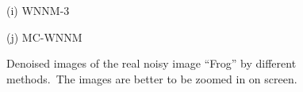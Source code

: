\documentclass[10pt,onecolumn,letterpaper]{article}
\begin{document}
\begin{figure}
{\begin{minipage}[t]{0.2\textwidth}
{\footnotesize (i) WNNM-3 \cite{wnnm}   }
\end{minipage}
\begin{minipage}[t]{0.2\textwidth}
\centering
{}
{\footnotesize (j) MC-WNNM  }
\end{minipage}
}
\vspace{-2mm}
\caption{Denoised images of the real noisy image ``Frog'' \cite{ncwebsite} by different methods.\ The images are better to be zoomed in on screen.}
\label{f3}
\end{figure}
\end{document}
